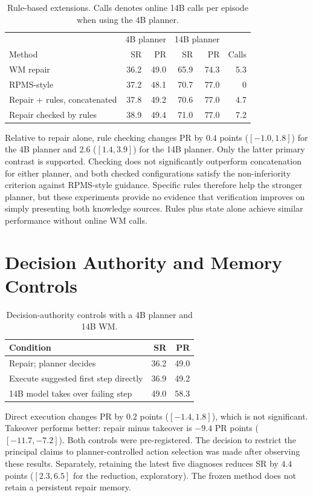 \begin{table}[h]
\caption{Rule-based extensions. Calls denotes online 14B calls per episode when using the 4B planner.}
\centering\begin{tabular}{lrrrrr}\toprule
& \multicolumn{2}{c}{4B planner} & \multicolumn{2}{c}{14B planner} & \\
Method & SR & PR & SR & PR & Calls\\\midrule
WM repair & 36.2 & 49.0 & 65.9 & 74.3 & 5.3\\
RPMS-style & 37.2 & 48.1 & 70.7 & 77.0 & 0\\
Repair + rules, concatenated & 37.8 & 49.2 & 70.6 & 77.0 & 4.7\\
Repair checked by rules & 38.9 & 49.4 & 71.0 & 77.0 & 7.2\\\bottomrule
\end{tabular}
\end{table}

Relative to repair alone, rule checking changes PR by $0.4$ points ($[-1.0,1.8]$) for the 4B planner and $2.6$ ($[1.4,3.9]$) for the 14B planner. Only the latter primary contrast is supported. Checking does not significantly outperform concatenation for either planner, and both checked configurations satisfy the non-inferiority criterion against RPMS-style guidance. Specific rules therefore help the stronger planner, but these experiments provide no evidence that verification improves on simply presenting both knowledge sources. Rules plus state alone achieve similar performance without online WM calls.

\section{Decision Authority and Memory Controls}
\begin{table}[h]
\caption{Decision-authority controls with a 4B planner and 14B WM.}
\centering\begin{tabular}{lrr}\toprule
Condition & SR & PR\\\midrule
Repair; planner decides & 36.2 & 49.0\\
Execute suggested first step directly & 36.9 & 49.2\\
14B model takes over failing step & 49.0 & 58.3\\\bottomrule
\end{tabular}
\end{table}
Direct execution changes PR by $0.2$ points ($[-1.4,1.8]$), which is not significant. Takeover performs better: repair minus takeover is $-9.4$ PR points ($[-11.7,-7.2]$). Both controls were pre-registered. The decision to restrict the principal claims to planner-controlled action selection was made after observing these results. Separately, retaining the latest five diagnoses reduces SR by $4.4$ points ($[2.3,6.5]$ for the reduction, exploratory). The frozen method does not retain a persistent repair memory.


